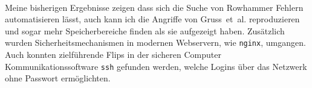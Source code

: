 \documentclass[a4paper]{article}
\newcommand{\etal}{et~al. }
\begin{document}
\paragraph{}

Meine bisherigen Ergebnisse zeigen dass sich die Suche von Rowhammer Fehlern automatisieren lässt, auch kann ich die Angriffe von Gruss~\etal\cite{flipinthewall} reproduzieren und sogar mehr Speicherbereiche finden als sie aufgezeigt haben. Zusätzlich wurden Sicherheitsmechanismen in modernen Webservern, wie \texttt{nginx}, umgangen. Auch konnten zielführende Flips in der sicheren Computer Kommunikationssoftware \texttt{ssh} gefunden werden, welche Logins über das Netzwerk ohne Passwort ermöglichten.


\pagebreak



\end{document}
